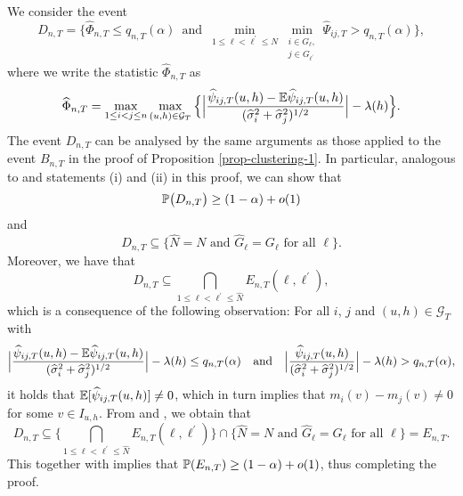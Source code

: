 \documentclass[a4paper,12pt]{article}
\makeatletter
\renewcommand{\eqref}[1]{\tagform@{\ref{#1}}}
\makeatother
\begin{document}
We consider the event
\[ D_{n,T} = \Big\{ \widehat{\Phi}_{n,T} \le q_{n,T}(\alpha) \, \text{ and } \,  \min_{1 \le \ell < \ell^\prime \le N} \min_{\substack{i \in G_\ell, \\ j \in G_{\ell^\prime}}} \widehat{\Psi}_{ij,T} > q_{n,T}(\alpha) \Big\}, \]
where we write the statistic $\widehat{\Phi}_{n,T}$ as
\[ \widehat{\Phi}_{n,T} = \max_{1 \le i < j \le n} \max_{(u,h) \in \mathcal{G}_T} \Big\{ \Big| \frac{\widehat{\psi}_{ij,T}(u,h)- \mathbb{E} \widehat{\psi}_{ij,T}(u,h)} {(\widehat{\sigma}_i^2 + \widehat{\sigma}_j^2)^{1/2}} \Big| - \lambda(h) \Big \}. \]
The event $D_{n,T}$ can be analysed by the same arguments as those applied to the event $B_{n,T}$ in the proof of Proposition \ref{prop-clustering-1}. In particular, analogous to \eqref{eq2-prop-clustering-1} and statements (i) and (ii) in this proof, we can show that
\begin{equation}\label{eq1-prop-clustering-2}
\mathbb{P} \big( D_{n,T} \big) \ge (1-\alpha) + o(1)
\end{equation}
and 
\begin{equation}\label{eq2-prop-clustering-2}
D_{n,T} \subseteq \big\{ \widehat{N} = N \text{ and } \widehat{G}_\ell = G_\ell \text{ for all } \ell \big\}.
\end{equation}
Moreover, we have that
\begin{equation}\label{eq3-prop-clustering-2}
D_{n,T} \subseteq \bigcap_{1 \le \ell < \ell^\prime \le \widehat{N}} E_{n,T}(\ell,\ell^\prime),
\end{equation}
which is a consequence of the following observation: For all $i$, $j$ and $(u,h) \in \mathcal{G}_T$ with 
\[ \Big|\frac{\widehat{\psi}_{ij,T}(u,h) - \mathbb{E} \widehat{\psi}_{ij,T}(u,h)}{(\widehat{\sigma}_i^2 + \widehat{\sigma}_j^2)^{1/2}}\Big| - \lambda(h) \le q_{n,T}(\alpha) \quad \text{and} \quad \Big|\frac{\widehat{\psi}_{ij,T}(u,h)}{(\widehat{\sigma}_i^2 + \widehat{\sigma}_j^2)^{1/2}}\Big| - \lambda(h) > q_{n,T}(\alpha), \]
it holds that $\mathbb{E}[\widehat{\psi}_{ij,T}(u,h)] \ne 0$, which in turn implies that $m_i(v) - m_j(v) \ne 0$ for some $v \in I_{u,h}$. From \eqref{eq2-prop-clustering-2} and \eqref{eq3-prop-clustering-2}, we obtain that 
\[ D_{n,T} \subseteq \Big\{ \bigcap_{1 \le \ell < \ell^\prime \le \widehat{N}} E_{n,T}(\ell,\ell^\prime) \Big\} \cap \big\{ \widehat{N} = N \text{ and } \widehat{G}_\ell = G_\ell \text{ for all } \ell \big\} = E_{n,T}. \] 
This together with \eqref{eq1-prop-clustering-2} implies that $\mathbb{P}(E_{n,T}) \ge (1-\alpha) + o(1)$, thus completing the proof. 
\end{document}
